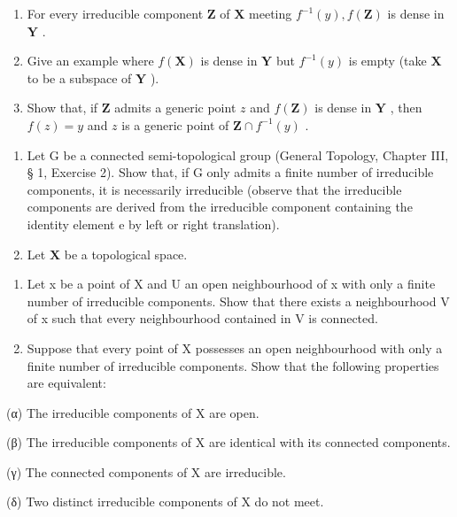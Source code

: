 \begin{enumerate}
\def\labelenumi{(\alph{enumi})}
\item
  For every irreducible component \(\mathbf{Z}\) of \(\mathbf{X}\) meeting \(f^{-1}(y), f(\mathbf{Z})\) is dense in \(\mathbf{Y}\) .
\item
  Give an example where \(f(\mathbf{X})\) is dense in \(\mathbf{Y}\) but \(f^{-1}(y)\) is empty (take \(\mathbf{X}\) to be a subspace of \(\mathbf{Y}\) ).
\item
  Show that, if \(\mathbf{Z}\) admits a generic point \(z\) and \(f(\mathbf{Z})\) is dense in \(\mathbf{Y}\) , then \(f(z) = y\) and \(z\) is a generic point of \(\mathbf{Z} \cap f^{-1}(y)\) .
\end{enumerate}

\begin{enumerate}
\def\labelenumi{\arabic{enumi}.}
\setcounter{enumi}{4}
\item
  Let G be a connected semi-topological group (General Topology, Chapter III, § 1, Exercise 2). Show that, if G only admits a finite number of irreducible components, it is necessarily irreducible (observe that the irreducible components are derived from the irreducible component containing the identity element e by left or right translation).
\item
  Let \(\mathbf{X}\) be a topological space.
\end{enumerate}

\begin{enumerate}
\def\labelenumi{(\alph{enumi})}
\item
  Let x be a point of X and U an open neighbourhood of x with only a finite number of irreducible components. Show that there exists a neighbourhood V of x such that every neighbourhood contained in V is connected.
\item
  Suppose that every point of X possesses an open neighbourhood with only a finite number of irreducible components. Show that the following properties are equivalent:
\end{enumerate}

(α) The irreducible components of X are open.

(β) The irreducible components of X are identical with its connected components.

(γ) The connected components of X are irreducible.

(δ) Two distinct irreducible components of X do not meet.

